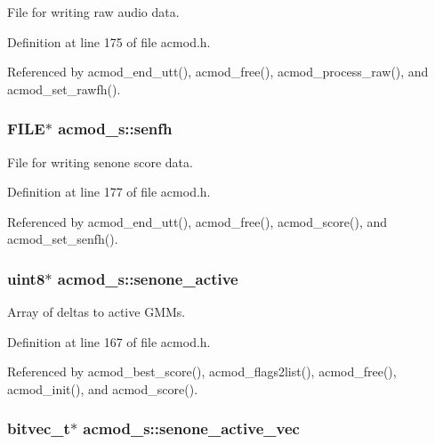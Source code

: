 File for writing raw audio data. 



Definition at line 175 of file acmod.\+h.



Referenced by acmod\+\_\+end\+\_\+utt(), acmod\+\_\+free(), acmod\+\_\+process\+\_\+raw(), and acmod\+\_\+set\+\_\+rawfh().

\subsubsection[{senfh}]{\setlength{\rightskip}{0pt plus 5cm}F\+I\+L\+E$\ast$ acmod\+\_\+s\+::senfh}\label{structacmod__s_aba97a9733b64074f3a4699dfbaed5ffd}


File for writing senone score data. 



Definition at line 177 of file acmod.\+h.



Referenced by acmod\+\_\+end\+\_\+utt(), acmod\+\_\+free(), acmod\+\_\+score(), and acmod\+\_\+set\+\_\+senfh().

\subsubsection[{senone\+\_\+active}]{\setlength{\rightskip}{0pt plus 5cm}uint8$\ast$ acmod\+\_\+s\+::senone\+\_\+active}\label{structacmod__s_a5c98c727daf4e6bb23534e00b30cb5c2}


Array of deltas to active G\+M\+Ms. 



Definition at line 167 of file acmod.\+h.



Referenced by acmod\+\_\+best\+\_\+score(), acmod\+\_\+flags2list(), acmod\+\_\+free(), acmod\+\_\+init(), and acmod\+\_\+score().

\subsubsection[{senone\+\_\+active\+\_\+vec}]{\setlength{\rightskip}{0pt plus 5cm}bitvec\+\_\+t$\ast$ acmod\+\_\+s\+::senone\+\_\+active\+\_\+vec}\label{structacmod__s_a4a3ad3a3dc9a7b36c024c77729012e55}



